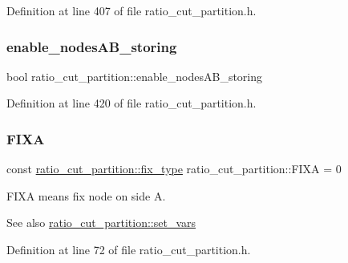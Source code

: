 Definition at line 407 of file ratio\+\_\+cut\+\_\+partition.\+h.

\mbox{\label{classratio__cut__partition_a6dff7e2e6cecdc63147fdee71d876a34}} 
\subsubsection{\texorpdfstring{enable\+\_\+nodes\+A\+B\+\_\+storing}{enable\_nodesAB\_storing}}
{\footnotesize\ttfamily bool ratio\+\_\+cut\+\_\+partition\+::enable\+\_\+nodes\+A\+B\+\_\+storing\hspace{0.3cm}{\ttfamily [protected]}}



Definition at line 420 of file ratio\+\_\+cut\+\_\+partition.\+h.

\mbox{\label{classratio__cut__partition_a2fe155c63de19dc08c16bcb382f0dcbc}} 
\subsubsection{\texorpdfstring{F\+I\+XA}{FIXA}}
{\footnotesize\ttfamily const \mbox{\hyperlink{classratio__cut__partition_a558dda40abda8ab03edb4605dbb81e36}{ratio\+\_\+cut\+\_\+partition\+::fix\+\_\+type}} ratio\+\_\+cut\+\_\+partition\+::\+F\+I\+XA = 0\hspace{0.3cm}{\ttfamily [static]}}

{\ttfamily F\+I\+XA} means fix node on side {\ttfamily A}.

\begin{DoxySeeAlso}{See also}
\mbox{\hyperlink{classratio__cut__partition_a4c143f82aac5fee3b955414ab7d6ce19}{ratio\+\_\+cut\+\_\+partition\+::set\+\_\+vars}} 
\end{DoxySeeAlso}


Definition at line 72 of file ratio\+\_\+cut\+\_\+partition.\+h.

\mbox{\label{classratio__cut__partition_aea621a2460229773cbc095814942963a}} 
